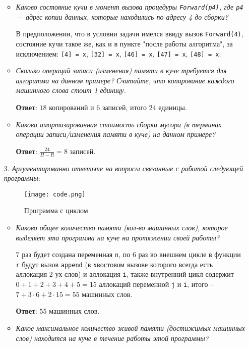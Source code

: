 \documentclass{article}
\begin{document}
\begin{enumerate}
\begin{itemize}
        \item \textit{Каково состояние кучи в момент вызова процедуры \texttt{Forward(p4)}, где \texttt{p4} — адрес копии данных, которые находились по адресу 4 до сборки?}

        В предположении, что в условии задачи имелся ввиду вызов \texttt{Forward(4)}, состояние кучи такое же, как и в пункте "после работы алгоритма", за исключением: \texttt{[4] = x}, \texttt{[32] = x}, \texttt{[46] = x}, \texttt{[47] = x}, \texttt{[48] = x}.

        \item \textit{Сколько операций записи (изменения) памяти в куче требуется для алгоритма на данном примере? Считайте, что копирование каждого машинного слова стоит 1 единицу.}

        \textbf{Ответ}: $18$ копирований и $6$ записей, итого $24$ единицы.

        \item \textit{Какова амортизированная стоимость сборки мусора (в терминах операции записи/изменения памяти в куче) на данном примере?}

        \textbf{Ответ}: $\frac{24}{H - R} = 8$ записей.
    \end{itemize}

    \item[3.] \textit{Аргументированно ответьте на вопросы связанные с работой следующей программы:}

    \begin{figure}[h]
    \centering
    \texttt{[image: code.png]}
    \caption{Программа с циклом}
    \label{fig:name}
    \end{figure}

    \begin{itemize}
        \item \textit{Каково общее количество памяти (кол-во машинных слов), которое выделяет эта программа на куче на протяжении своей работы?}
    
        $7$ раз будет создана переменная \texttt{n}, по $6$ раз во внешнем цикле в функции \texttt{r} будут вызов \texttt{append} (в хвостовом вызове которого всегда есть аллокация $2$-ух слов) и аллокация \texttt{i}, также внутренний цикл содержит $0 + 1 + 2 + 3 + 4 + 5 = 15$ аллокаций переменной \texttt{j} и \texttt{i}, итого -- $7 + 3\cdot6 + 2\cdot15= 55$ машинных слов.

        \textbf{Ответ}: $55$ машинных слов.

        \item \textit{Какое максимальное количество живой памяти (достижимых машинных слов) находится на куче в течение работы этой программы?}


\end{itemize}
\end{enumerate}
\end{document}
